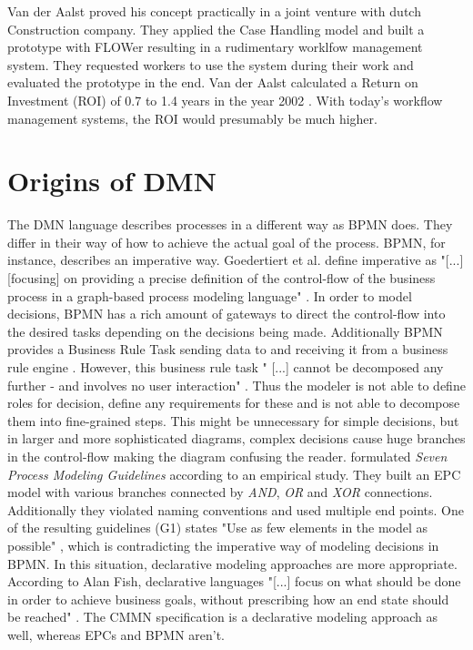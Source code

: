 Van der Aalst proved his concept practically in a joint venture with dutch Construction company. They applied the Case Handling model and built a prototype with FLOWer resulting in a rudimentary worklfow management system. They requested workers to use the system during their work and evaluated the prototype in the end. Van der Aalst calculated a Return on Investment (ROI) of 0.7 to 1.4 years in the year 2002 \cite{aalst2003}. With today's workflow management systems, the ROI would presumably be much higher. 

\section{Origins of DMN}
The \acl{DMN} language describes processes in a different way as \ac{BPMN} does. They differ in their way of how to achieve the actual goal of the process. BPMN, for instance, describes an imperative way. Goedertiert et al. define imperative as "[...] [focusing] on providing a precise definition of the control-flow of the business process in a graph-based process modeling language" \cite{Goedertier2013}. In order to model decisions, BPMN has a rich amount of gateways to direct the control-flow into the desired tasks depending on the decisions being made. Additionally BPMN provides a Business Rule Task sending data to and receiving it from a business rule engine \cite{BPMNspec}. However, this business rule task " [...] cannot be decomposed any further - and involves no user interaction" \cite{Fish2012}. Thus the modeler is not able to define roles for decision, define any requirements for these and is not able to decompose them into fine-grained steps. This might be unnecessary for simple decisions, but in larger and more sophisticated diagrams, complex decisions cause huge branches in the control-flow making the diagram confusing the reader. \cite{MendlingReijersAalst2010} formulated \textit{Seven Process Modeling Guidelines} according to an empirical study. They built an EPC model with various branches connected by \textit{AND}, \textit{OR} and \textit{XOR} connections. Additionally they violated naming conventions and used multiple end points. One of the resulting guidelines (G1) states "Use as few elements in the model as possible" \cite{MendlingReijersAalst2010}, which is contradicting the imperative way of modeling decisions in BPMN.  
In this situation, declarative modeling approaches are more appropriate. According to Alan Fish, declarative languages "[...] focus on what should be done in order to achieve business goals, without prescribing how an end state should be reached" \cite{Fish2012}. The CMMN specification is a declarative modeling approach as well, whereas EPCs and BPMN aren't. 
